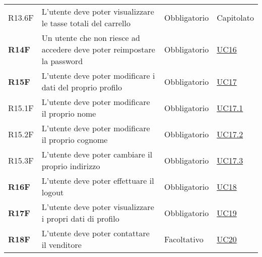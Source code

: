 \begin{center}
\begin{longtable}[!h]{p{50px} p{245px} p{75px} p{50px}}
        R13.6F                                & L'utente deve poter visualizzare le tasse totali del carrello                                                                                       & Obbligatorio             & Capitolato                                     \\
        \textbf{R14F}                         & Un utente che non riesce ad accedere deve poter reimpostare la password                                                                             & Obbligatorio             & \hyperref[sec:UC16]{UC16}                      \\
        \textbf{R15F}                         & L'utente deve poter modificare i dati del proprio profilo                                                                                           & Obbligatorio             & \hyperref[sec:UC17]{UC17}                      \\
        R15.1F                                & L'utente deve poter modificare il proprio nome                                                                                                      & Obbligatorio             & \hyperref[sec:UC17.1]{UC17.1}                  \\
        R15.2F                                & L'utente deve poter modificare il proprio cognome                                                                                                   & Obbligatorio             & \hyperref[sec:UC17.2]{UC17.2}                  \\
        R15.3F                                & L'utente deve poter cambiare il proprio indirizzo                                                                                                   & Obbligatorio             & \hyperref[sec:UC17.3]{UC17.3}                  \\
        \textbf{R16F}                         & L'utente deve poter effettuare il logout                                                                                                            & Obbligatorio             & \hyperref[sec:UC18]{UC18}                      \\
        \textbf{R17F}                         & L'utente deve poter visualizzare i propri dati di profilo                                                                                           & Obbligatorio             & \hyperref[sec:UC19]{UC19}                      \\
        \textbf{R18F}                         & L'utente deve poter contattare il venditore                                                                                                         & Facoltativo              & \hyperref[sec:UC20]{UC20}                      \\

\end{longtable}
\end{center}
